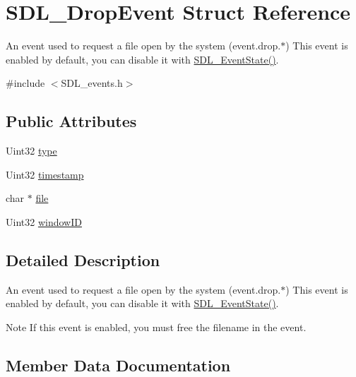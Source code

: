 \hypertarget{struct_s_d_l___drop_event}{}\section{S\+D\+L\+\_\+\+Drop\+Event Struct Reference}
\label{struct_s_d_l___drop_event}


An event used to request a file open by the system (event.\+drop.$\ast$) This event is enabled by default, you can disable it with \mbox{\hyperlink{_s_d_l__events_8h_afb772893e1c46f186fa39a4defe76df3}{S\+D\+L\+\_\+\+Event\+State()}}.  




{\ttfamily \#include $<$S\+D\+L\+\_\+events.\+h$>$}

\subsection*{Public Attributes}
\begin{DoxyCompactItemize}
\item 
Uint32 \mbox{\hyperlink{struct_s_d_l___drop_event_a5ea27cfaa5f8d4940e9a69b68b3cc035}{type}}
\item 
Uint32 \mbox{\hyperlink{struct_s_d_l___drop_event_a02d2c81bb22db632a40cd0021ff751ab}{timestamp}}
\item 
char $\ast$ \mbox{\hyperlink{struct_s_d_l___drop_event_abc41ef4beb62e1d8b56827128b29585f}{file}}
\item 
Uint32 \mbox{\hyperlink{struct_s_d_l___drop_event_a8cecd2178cdc04118bf852e7cf7bf647}{window\+ID}}
\end{DoxyCompactItemize}


\subsection{Detailed Description}
An event used to request a file open by the system (event.\+drop.$\ast$) This event is enabled by default, you can disable it with \mbox{\hyperlink{_s_d_l__events_8h_afb772893e1c46f186fa39a4defe76df3}{S\+D\+L\+\_\+\+Event\+State()}}. 

\begin{DoxyNote}{Note}
If this event is enabled, you must free the filename in the event. 
\end{DoxyNote}


\subsection{Member Data Documentation}
\mbox{\label{struct_s_d_l___drop_event_abc41ef4beb62e1d8b56827128b29585f}} 
